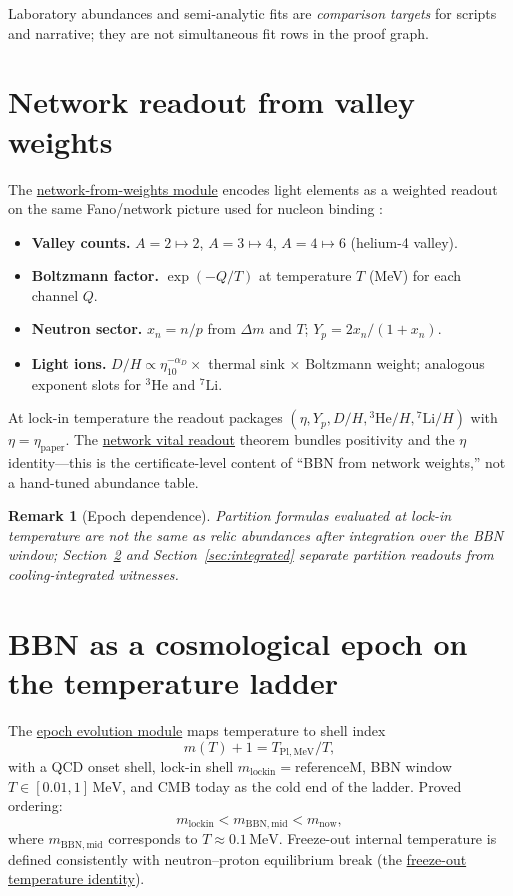 \documentclass[11pt]{amsart}
\newtheorem{remark}[theorem]{Remark}
\begin{document}
Laboratory abundances and semi-analytic fits are \emph{comparison targets}
for scripts and narrative; they are not simultaneous fit rows in the proof
graph.

\section{Network readout from valley weights}
\label{sec:network}

The \hyperref[lean:bbn-network]{network-from-weights module} encodes light
elements as a weighted readout on the same Fano/network picture used for
nucleon binding \cite{hqiv-tuft-sm-lagrangian-paper}:

\begin{itemize}[leftmargin=2em]
\item \textbf{Valley counts.}
  $A=2\mapsto 2$, $A=3\mapsto 4$, $A=4\mapsto 6$ (helium-4 valley).
\item \textbf{Boltzmann factor.}
  $\exp(-Q/T)$ at temperature $T$ (MeV) for each channel $Q$.
\item \textbf{Neutron sector.}
  $x_n=n/p$ from $\Delta m$ and $T$; $Y_p=2x_n/(1+x_n)$.
\item \textbf{Light ions.}
  $D/H\propto \eta_{10}^{-\alpha_D}\times$ thermal sink $\times$
  Boltzmann weight; analogous exponent slots for $^3\mathrm{He}$ and
  $^7\mathrm{Li}$.
\end{itemize}

At lock-in temperature the readout packages
$(\eta,Y_p,D/H,{}^3\mathrm{He}/H,{}^7\mathrm{Li}/H)$ with
$\eta=\eta_{\mathrm{paper}}$. The
\hyperref[lean:bbn-network-vital]{network vital readout} theorem bundles
positivity and the $\eta$ identity---this is the certificate-level content
of ``BBN from network weights,'' not a hand-tuned abundance table.

\begin{remark}[Epoch dependence]
Partition formulas evaluated at lock-in temperature are \emph{not} the same
as relic abundances after integration over the BBN window; Section~\ref{sec:epoch}
and Section~\ref{sec:integrated} separate partition readouts from
cooling-integrated witnesses.
\end{remark}

\section{BBN as a cosmological epoch on the temperature ladder}
\label{sec:epoch}

The \hyperref[lean:bbn-epoch-evolution]{epoch evolution module} maps
temperature to shell index
\[
  m(T)+1 = T_{\mathrm{Pl,MeV}}/T,
\]
with a QCD onset shell, lock-in shell $m_{\mathrm{lockin}}=\mathrm{referenceM}$,
BBN window $T\in[0.01,1]\,\mathrm{MeV}$, and CMB today as the cold end of
the ladder. Proved ordering:
\[
  m_{\mathrm{lockin}} < m_{\mathrm{BBN,mid}} < m_{\mathrm{now}},
\]
where $m_{\mathrm{BBN,mid}}$ corresponds to $T\approx 0.1\,\mathrm{MeV}$.
Freeze-out internal temperature is defined consistently with neutron--proton
equilibrium break (the \hyperref[lean:bbn-freezeout-temp]{freeze-out
temperature identity}).
\end{document}
